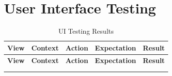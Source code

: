\chapter{User Interface Testing}
\label{app:ui_test}


\begin{xltabular}{\textwidth}{|
  >{\raggedright\arraybackslash{}\hsize}X |
  >{\raggedright\arraybackslash{}\hsize}X |
  >{\raggedright\arraybackslash{}\hsize}X | 
  >{\raggedright\arraybackslash{}\hsize}X |  
  p{1cm} |} 
\caption{UI Testing Results} \label{tab:ui_testing} \\
\hline
\textbf{View} & \textbf{Context} & \textbf{Action} & \textbf{Expectation} & \textbf{Result} \\
\hline
\endfirsthead

\hline
\textbf{View} & \textbf{Context} & \textbf{Action} & \textbf{Expectation} & \textbf{Result} \\
\hline
\endhead

\hline
{} \\
\endfoot

\hline
\endlastfoot


\end{xltabular}
